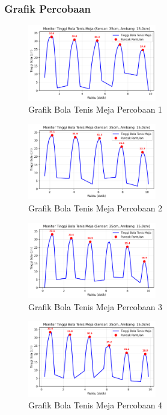 \subsubsection{Grafik Percobaan}
\begin{figure}[htbp]
    \centering
    \includegraphics[width=0.5\textwidth]{chapters/DataPercobaan/Grafik_Bola_Tenis_Meja_1.png}
    \caption{Grafik Bola Tenis Meja Percobaan 1}
\end{figure}
\begin{figure}[htbp]
    \centering
    \includegraphics[width=0.5\textwidth]{chapters/DataPercobaan/Grafik_Bola_Tenis_Meja_2.png}
    \caption{Grafik Bola Tenis Meja Percobaan 2}
\end{figure}
\begin{figure}[htbp]
    \centering
    \includegraphics[width=0.5\textwidth]{chapters/DataPercobaan/Grafik_Bola_Tenis_Meja_3.png}
    \caption{Grafik Bola Tenis Meja Percobaan 3}
\end{figure}
\begin{figure}[htbp]
    \centering
    \includegraphics[width=0.5\textwidth]{chapters/DataPercobaan/Grafik_Bola_Tenis_Meja_4.png}
    \caption{Grafik Bola Tenis Meja Percobaan 4}
\end{figure}
